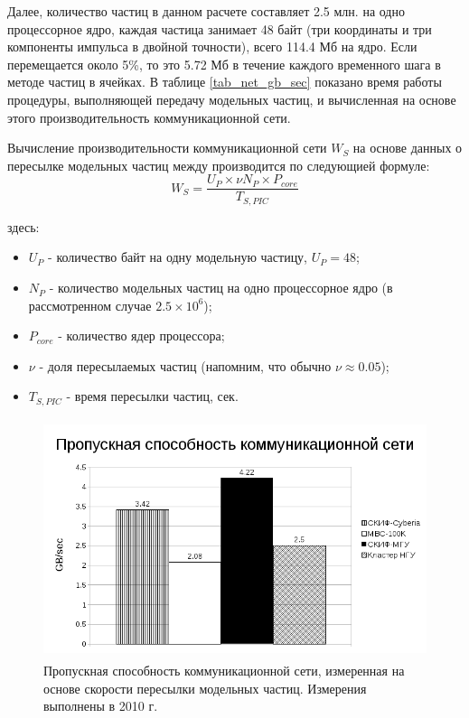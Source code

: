Далее, количество частиц в данном расчете составляет 2.5 млн. на одно процессорное ядро, каждая частица занимает 48 байт (три координаты и три компоненты импульса в двойной точности), всего 114.4 Мб на ядро. Если перемещается около 5\%, то это 5.72 Мб в течение каждого временного шага в методе частиц в ячейках. В таблице \ref{tab_net_gb_sec} показано время работы процедуры, выполняющей передачу модельных частиц, и вычисленная на основе этого производительность коммуникационной сети.


Вычисление производительности коммуникационной сети $W_S$ на основе данных о пересылке модельных частиц между  производится по следующией формуле:
\begin{equation}
W_S = \frac{U_P\times \nu N_P \times P_{core}}{T_{S,PIC}}
\label{Net_performance_peer}
\end{equation}


здесь:
\begin{itemize}
	\item $U_P$ - количество байт на одну модельную частицу, $U_P = 48$;
	\item $N_P$ - количество модельных частиц на одно процессорное ядро (в рассмотренном случае $2.5\times 10^6$);  
	\item $P_{core}$ - количество ядер процессора;
	\item $\nu$ - доля пересылаемых частиц (напомним, что обычно $\nu \approx 0.05$);
	\item $T_{S,PIC}$  - время пересылки частиц, сек.
\end{itemize}	



\begin{figure}[htb]
	\begin{center}
		\includegraphics[height=7cm,keepaspectratio]{images/network_throughput_GB_sec.png}
	\end{center}
	\caption{Пропускная способность коммуникационной сети, измеренная на основе скорости пересылки модельных частиц. Измерения выполнены в 2010 г.}
	\label{plot_net_gb_sec}
\end{figure} 

